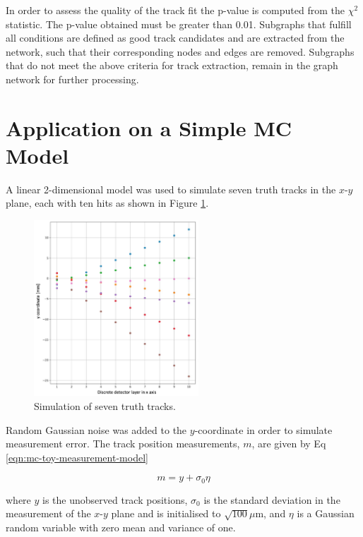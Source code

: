 In order to assess the quality of the track fit the p-value is computed from the $\chi^2$ statistic. The p-value obtained must be greater than 0.01. Subgraphs that fulfill all conditions are defined as good track candidates and are extracted from the network, such that their corresponding nodes and edges are removed. Subgraphs that do not meet the above criteria for track extraction, remain in the graph network for further processing.





\section{Application on a Simple MC Model}
\label{gnn-application-toy-model}

A linear 2-dimensional model was used to simulate seven truth tracks in the $x$-$y$ plane, each with ten hits as shown in Figure \ref{fig:ground-truth}. 

\begin{figure}[htbp]
    \centering
    \includegraphics[width=0.55\textwidth]{images/5-gnn-algorithm/ground-truth.png}
    \caption{Simulation of seven truth tracks.}
    \label{fig:ground-truth}%
\end{figure}

Random Gaussian noise was added to the $y$-coordinate in order to simulate measurement error. The track position measurements, $m$, are given by Eq \eqref{eqn:mc-toy-measurement-model}

\begin{equation}
m = y + \sigma_0 \eta
\label{eqn:mc-toy-measurement-model}
\end{equation}

where $y$ is the unobserved track positions, $\sigma_0$ is the standard deviation in the measurement of the $x$-$y$ plane and is initialised to $\sqrt{100} \mu $m, and $\eta$ is a Gaussian random variable with zero mean and variance of one.

